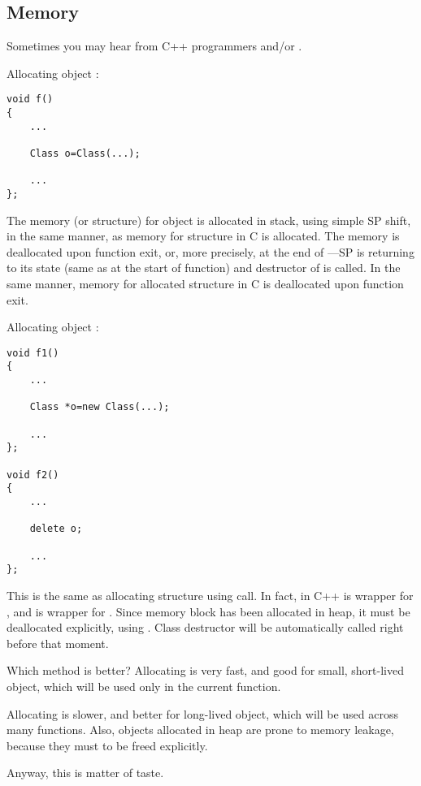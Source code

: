 \subsection{Memory}

Sometimes you may hear from C++ programmers  and/or .

Allocating object :

\begin{lstlisting}[style=customc]
void f()
{
	...

	Class o=Class(...);

	...
};
\end{lstlisting}

The memory (or structure) for object is allocated in stack, using simple \ac{SP} shift, in the same manner, as memory for structure in C is allocated.
The memory is deallocated upon function exit, or, more precisely, at the end of ---\ac{SP} is returning to its state (same as at the start of function) and destructor of  is called.
In the same manner, memory for allocated structure in C is deallocated upon function exit.

Allocating object :

\begin{lstlisting}[style=customc]
void f1()
{
	...

	Class *o=new Class(...);

	...
};

void f2()
{
	...

	delete o;

	...
};
\end{lstlisting}

This is the same as allocating structure using  call.
In fact,  in C++ is wrapper for , and  is wrapper for .
Since memory block has been allocated in \gls{heap}, it must be deallocated explicitly, using .
Class destructor will be automatically called right before that moment.

Which method is better?
Allocating  is very fast, and good for small, short-lived object, which will be used only in the current function.

Allocating  is slower, and better for long-lived object, which will be used across many functions.
Also, objects allocated in \gls{heap} are prone to memory leakage, because they must to be freed explicitly.

Anyway, this is matter of taste.
